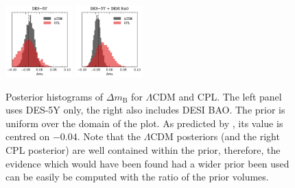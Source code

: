 \documentclass[fleqn,usenatbib]{mnras}
\newcommand{\lcdm}{$\Lambda$CDM}
\newcommand{\dmb}{\ensuremath{\Delta m_\mathrm B}}
\begin{document}
    \begin{figure}
        \begin{center}
            \includegraphics[width=0.23\textwidth]{plots/dmb_des5y.pdf}
            \includegraphics[width=0.23\textwidth]{plots/dmb_desidr2_des5y.pdf}
        \end{center}
        \caption{
            Posterior histograms of \dmb{} for \lcdm{} and CPL.
            The left panel uses DES-5Y only, the right also includes DESI BAO.
            The prior is uniform over the domain of the plot.
            As predicted by \citet{georgedes5y}, its value is centred on $-0.04$.
            Note that the \lcdm{} posteriors (and the right CPL posterior) are well contained within the prior, therefore, the evidence which would have been found had a wider prior been used can be easily be computed with the ratio of the prior volumes.
        }\label{fig:dmb}
    \end{figure}
    
\end{document}
